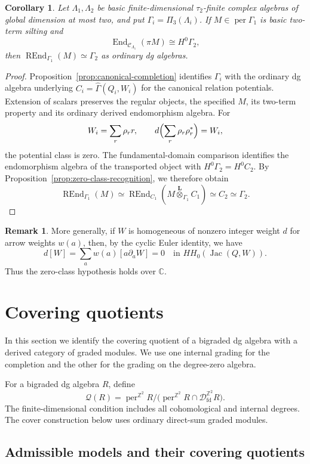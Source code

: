 \documentclass[12pt,a4paper,english,reqno]{amsart}
\theoremstyle{plain}
\newtheorem{cor}[thm]{Corollary}
\theoremstyle{definition}
\newtheorem{rmk}[thm]{Remark}
\numberwithin{equation}{section}
\newcommand{\prpref}[1]{Proposition~\ref{#1}}
\def\ro{\rho}
\def\ta{\tau}
\def\Ga{\Gamma}
\def\La{\Lambda}
\def\End{\operatorname{End}}
\def\perf{\operatorname{per}}
\def\calC{{\mathcal C}}
\def\calD{{\mathcal D}}
\def\bbZ{{\mathbb Z}}
\def\bbC{{\mathbb C}}
\def\iso{\cong}
\def\Lox{\overset{\mathbf{L}}{\otimes}}
\def\REnd{\operatorname{REnd}}
\def\Jac{\operatorname{Jac}}
\def\fd{\mathrm{fd}}
\begin{document}
\begin{cor}\label{prop:recognition}
Let $\La_1,\La_2$ be basic finite-dimensional $\ta_2$-finite complex algebras of global dimension at most two, and put $\Ga_i=\Pi_3(\La_i)$. If $M\in\perf\Ga_1$ is basic two-term silting and
\[
 \End_{\calC_{\La_1}}(\pi M)\iso H^0\Ga_2,
\]
then $\REnd_{\Ga_1}(M)\simeq\Ga_2$ as ordinary dg algebras.
\end{cor}
\begin{proof}
\prpref{prop:canonical-completion} identifies $\Ga_i$ with the ordinary dg algebra underlying $C_i=\widehat\Ga(Q_i,W_i)$ for the canonical relation potentials. Extension of scalars preserves the regular objects, the specified $M$, its two-term property and its ordinary derived endomorphism algebra. For
\[
 W_i=\sum_r\ro_r r,
 \qquad d\Bigl(\sum_r\ro_r\ro_r^*\Bigr)=W_i,
\]
the potential class is zero. The fundamental-domain comparison identifies the endomorphism algebra of the transported object with $H^0\Ga_2=H^0C_2$. By \prpref{prop:zero-class-recognition}, we therefore obtain
\[
 \REnd_{\Ga_1}(M)\simeq\REnd_{C_1}(M\Lox_{\Ga_1}C_1)
 \simeq C_2\simeq\Ga_2.
\]
\end{proof}

\begin{rmk}
More generally, if $W$ is homogeneous of nonzero integer weight $d$ for arrow weights $w(a)$, then, by the cyclic Euler identity, we have
\[
 d[W]=\sum_a w(a)[a\partial_aW]=0
 \quad\text{in }HH_0(\Jac(Q,W)).
\]
Thus the zero-class hypothesis holds over $\bbC$.
\end{rmk}

\section{Covering quotients}\label{sec:cover}
In this section we identify the covering quotient of a bigraded dg algebra with a derived category of graded modules. We use one internal grading for the completion and the other for the grading on the degree-zero algebra.

For a bigraded dg algebra $R$, define
\[
 \mathcal Q(R)=\perf^{\bbZ^2}R/
 \bigl(\perf^{\bbZ^2}R\cap\calD_{\fd}^{\bbZ^2}R\bigr).
\]
The finite-dimensional condition includes all cohomological and internal degrees. The cover construction below uses ordinary direct-sum graded modules.

\subsection{Admissible models and their covering quotients}
\end{document}
